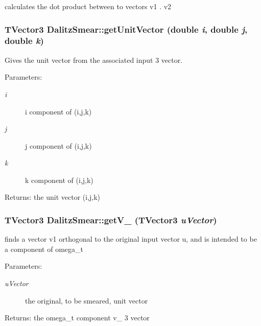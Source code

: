 calculates the dot product between to vectors v1 . v2 

\subsubsection{\setlength{\rightskip}{0pt plus 5cm}TVector3 Dalitz\-Smear::get\-Unit\-Vector (double {\em i}, double {\em j}, double {\em k})\hspace{0.3cm}{\tt  [private]}}\label{classDalitzSmear_c76e17e12e0cc4710c1682bd8b714f86}


Gives the unit vector from the associated input 3 vector. 

\begin{Desc}
\item[Parameters:]
\begin{description}
\item[{\em i}]i component of (i,j,k) \item[{\em j}]j component of (i,j,k) \item[{\em k}]k component of (i,j,k) \end{description}
\end{Desc}
\begin{Desc}
\item[Returns:]the unit vector (i,j,k) \end{Desc}
\subsubsection{\setlength{\rightskip}{0pt plus 5cm}TVector3 Dalitz\-Smear::get\-V\_ (TVector3 {\em u\-Vector})\hspace{0.3cm}{\tt  [private]}}\label{classDalitzSmear_63a8df4cff5fd53365540b5d0330b4d4}


finds a vector v1 orthogonal to the original input vector u, and is intended to be a component of omega\_\-t 

\begin{Desc}
\item[Parameters:]
\begin{description}
\item[{\em u\-Vector}]the original, to be smeared, unit vector \end{description}
\end{Desc}
\begin{Desc}
\item[Returns:]the omega\_\-t component v\_ 3 vector \end{Desc}
